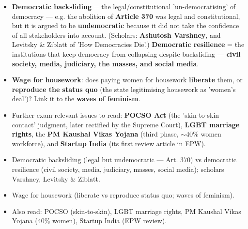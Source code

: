 \begin{KeyConcept}
\begin{itemize}
\item \textbf{Democratic backsliding} = the legal/constitutional 'un-democratising' of democracy --- e.g. the abolition of \textbf{Article 370} was legal and constitutional, but it is argued to be \textbf{undemocratic} because it did not take the confidence of all stakeholders into account. (Scholars: \textbf{Ashutosh Varshney}, and Levitsky \& Ziblatt of 'How Democracies Die'.) \textbf{Democratic resilience} = the institutions that keep democracy from collapsing despite backsliding --- \textbf{civil society, media, judiciary, the masses, and social media}.
\item \textbf{Wage for housework}: does paying women for housework \textbf{liberate} them, or \textbf{reproduce the status quo} (the state legitimising housework as 'women's deal')? Link it to the \textbf{waves of feminism}.
\item Further exam-relevant issues to read: \textbf{POCSO Act} (the 'skin-to-skin contact' judgment, later rectified by the Supreme Court), \textbf{LGBT marriage rights}, the \textbf{PM Kaushal Vikas Yojana} (third phase, $\sim$40\% women workforce), and \textbf{Startup India} (its first review article in EPW).
\end{itemize}
\end{KeyConcept}

\begin{QuickRevision}
\begin{itemize}
\item Democratic backsliding (legal but undemocratic --- Art. 370) vs democratic resilience (civil society, media, judiciary, masses, social media); scholars Varshney, Levitsky \& Ziblatt.
\item Wage for housework (liberate vs reproduce status quo; waves of feminism).
\item Also read: POCSO (skin-to-skin), LGBT marriage rights, PM Kaushal Vikas Yojana (40\% women), Startup India (EPW review).
\end{itemize}
\end{QuickRevision}
